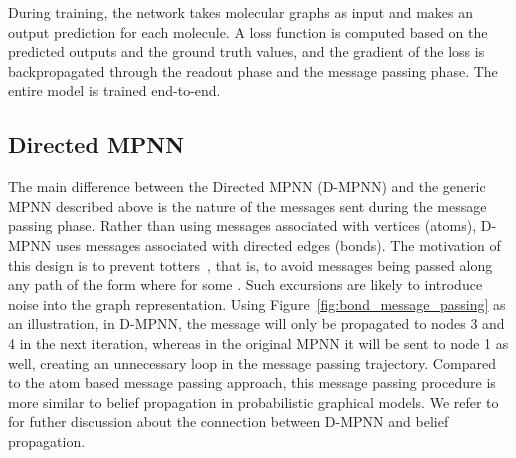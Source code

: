 \documentclass[journal=jcisd8,manuscript=article]{achemso}
\begin{document}
During training, the network takes molecular graphs as input and makes an output prediction for each molecule. A loss function is computed based on the predicted outputs and the ground truth values, and the gradient of the loss is backpropagated through the readout phase and the message passing phase. The entire model is trained end-to-end. 

\subsection{Directed MPNN}

The main difference between the Directed MPNN (D-MPNN)\cite{dai2016discriminative} and the generic MPNN described above is the nature of the messages sent during the message passing phase. Rather than using messages associated with vertices (atoms), D-MPNN uses messages associated with directed edges (bonds).
The motivation of this design is to prevent totters~\citep{mahe2004extensions}, that is, to avoid messages being passed along any path of the form  where  for some . Such excursions are likely to introduce noise into the graph representation. Using Figure~\ref{fig:bond_message_passing} as an illustration, in D-MPNN, the message  will only be propagated to nodes 3 and 4 in the next iteration, whereas in the original MPNN it will be sent to node 1 as well, creating an unnecessary loop in the message passing trajectory. Compared to the atom based message passing approach, this message passing procedure is more similar to belief propagation in probabilistic graphical models\cite{koller2009probabilistic}. We refer to \citeauthor{dai2016discriminative}\cite{dai2016discriminative} for futher discussion about the connection between D-MPNN and belief propagation.


\FloatBarrier
\end{document}

